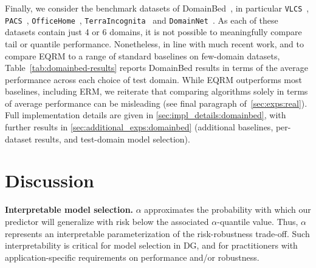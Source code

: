 \documentclass{article}
\begin{document}
Finally, we consider the benchmark datasets of DomainBed~\cite{gulrajani2020search}, in particular \texttt{VLCS}~\citep{fang2013}, \texttt{PACS}~\citep{li2017deeper}, \texttt{OfficeHome}~\citep{venkateswara2017}, \texttt{TerraIncognita}~\citep{beery2018recognition} and \texttt{DomainNet}~\citep{peng2019moment}. As each of these datasets contain just 4 or 6 domains, it is not possible to meaningfully compare tail or quantile performance. Nonetheless, in line with much recent work, and to compare EQRM to a range of standard baselines on few-domain datasets, Table~\ref{tab:domainbed-results} reports DomainBed results in terms of the average performance across each choice of test domain. While EQRM outperforms most baselines, including ERM, we reiterate that comparing algorithms solely in terms of average performance can be misleading (see final paragraph of~\cref{sec:exps:real}). Full implementation details are given in \cref{sec:impl_details:domainbed}, with further results in \cref{sec:additional_exps:domainbed} (additional baselines, per-dataset results, and test-domain model selection). 

%


\section{Discussion}\label{sec:discussion}\vspace{-1mm}
\textbf{Interpretable model selection.} $\alpha$ approximates the probability with which our predictor will generalize with risk below the associated $\alpha$-quantile value. Thus, $\alpha$ represents an interpretable parameterization of the risk-robustness trade-off. Such interpretability is critical for model selection in DG, and for practitioners with application-specific requirements on performance and/or robustness.
\end{document}
